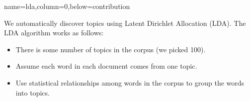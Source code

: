 \documentclass[landscape,final]{baposter}
\begin{document}
\begin{poster}
     \newlength{\leftimgwidth}
     \setlength{\leftimgwidth}{0.78em+8.0em}

    \newcommand{\colouredcircle}[1]{%
      \tikz{\useasboundingbox (-0.2em,-0.32em) rectangle(0.2em,0.32em); \draw[draw=black,fill=baposterBGone!80!black!#1!white,line width=0.03em] (0,0) circle(0.18em);}}


  {name=lda,column=0,below=contribution}{

	  We automatically discover topics using Latent Dirichlet Allocation (LDA).
	  The LDA algorithm works as follows:
	  \begin{itemize}
		\item There is some number of topics in the corpus (we picked 100).
		\item Assume each word in each document comes from one topic.
		\item Use statistical relationships among words in the corpus to group 
		  the words into topics.
	  \end{itemize}

}
\end{poster}
\end{document}
